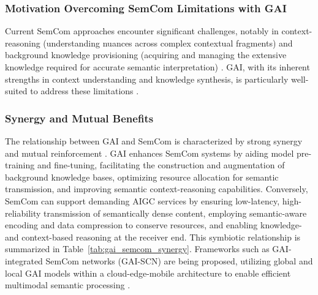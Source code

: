 \documentclass[sigconf]{acmart}
\begin{document}
\subsubsection{Motivation Overcoming SemCom Limitations with GAI}\label{subsubsec:semcom_motivation}
Current SemCom approaches encounter significant challenges, notably in context-reasoning (understanding nuances across complex contextual fragments) and background knowledge provisioning (acquiring and managing the extensive knowledge required for accurate semantic interpretation) \cite{ref23}. GAI, with its inherent strengths in context understanding and knowledge synthesis, is particularly well-suited to address these limitations \cite{ref23}.

\subsubsection{Synergy and Mutual Benefits}\label{subsubsec:semcom_synergy}
The relationship between GAI and SemCom is characterized by strong synergy and mutual reinforcement \cite{ref22, ref23, ref24}. GAI enhances SemCom systems by aiding model pre-training and fine-tuning, facilitating the construction and augmentation of background knowledge bases, optimizing resource allocation for semantic transmission, and improving semantic context-reasoning capabilities. Conversely, SemCom can support demanding AIGC services by ensuring low-latency, high-reliability transmission of semantically dense content, employing semantic-aware encoding and data compression to conserve resources, and enabling knowledge- and context-based reasoning at the receiver end. This symbiotic relationship is summarized in Table~\ref{tab:gai_semcom_synergy}. Frameworks such as GAI-integrated SemCom networks (GAI-SCN) are being proposed, utilizing global and local GAI models within a cloud-edge-mobile architecture to enable efficient multimodal semantic processing \cite{ref23}.
\end{document}
